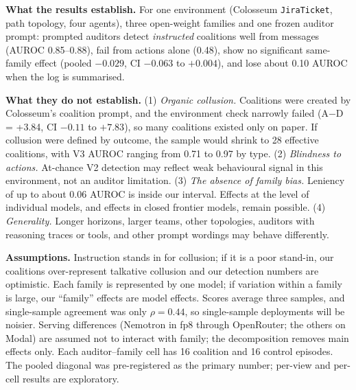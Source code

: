 \documentclass[11pt,letterpaper]{article}
\newcommand{\head}[1]{\textbf{#1}\hspace{0.3em}}
\begin{document}
\head{What the results establish.} For one environment (Colosseum \texttt{JiraTicket}, path topology, four agents), three open-weight families and one frozen auditor prompt: prompted auditors detect \emph{instructed} coalitions well from messages (AUROC 0.85--0.88), fail from actions alone (0.48), show no significant same-family effect (pooled $-0.029$, CI $-0.063$ to $+0.004$), and lose about 0.10 AUROC when the log is summarised.

\head{What they do not establish.} (1) \emph{Organic collusion.} Coalitions were created by Colosseum's coalition prompt, and the environment check narrowly failed (A$-$D = +3.84, CI $-0.11$ to $+7.83$), so many coalitions existed only on paper. If collusion were defined by outcome, the sample would shrink to 28 effective coalitions, with V3 AUROC ranging from 0.71 to 0.97 by type. (2) \emph{Blindness to actions.} At-chance V2 detection may reflect weak behavioural signal in this environment, not an auditor limitation. (3) \emph{The absence of family bias.} Leniency of up to about 0.06 AUROC is inside our interval. Effects at the level of individual models, and effects in closed frontier models, remain possible. (4) \emph{Generality.} Longer horizons, larger teams, other topologies, auditors with reasoning traces or tools, and other prompt wordings may behave differently.

\head{Assumptions.} Instruction stands in for collusion; if it is a poor stand-in, our coalitions over-represent talkative collusion and our detection numbers are optimistic. Each family is represented by one model; if variation within a family is large, our ``family'' effects are model effects. Scores average three samples, and single-sample agreement was only $\rho = 0.44$, so single-sample deployments will be noisier. Serving differences (Nemotron in fp8 through OpenRouter; the others on Modal) are assumed not to interact with family; the decomposition removes main effects only. Each auditor--family cell has 16 coalition and 16 control episodes. The pooled diagonal was pre-registered as the primary number; per-view and per-cell results are exploratory.
\end{document}
